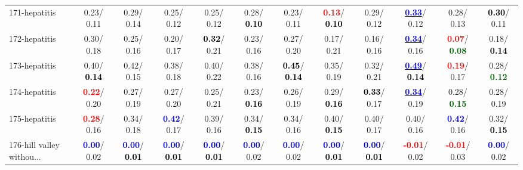 \begin{table}[h]
\begin{center}
{\begin{tabular}{lc|c|c|c|c|c|c|c|c|c|c}
171-hepatitis &   0.23/  0.11 &   0.29/  0.14 &   0.25/  0.12 &   0.25/  0.12 &   0.28/\textcolor{black}{\textbf{  0.10}} &   0.23/  0.11 & \textcolor{red}{\textbf{  0.13}}/\textcolor{black}{\textbf{  0.10}} &   0.29/  0.12 & \underline{\textcolor{blue}{\textbf{  0.33}}}/  0.12 &   0.28/  0.13 & \textcolor{black}{\textbf{  0.30}}/  0.11 \\
172-hepatitis &   0.30/  0.18 &   0.25/  0.16 &   0.20/  0.17 & \textcolor{black}{\textbf{  0.32}}/  0.21 &   0.23/  0.16 &   0.27/  0.20 &   0.17/  0.21 &   0.16/  0.16 & \underline{\textcolor{blue}{\textbf{  0.34}}}/  0.16 & \textcolor{red}{\textbf{  0.07}}/\textcolor{darkgreen}{\textbf{  0.08}} &   0.18/\textcolor{black}{\textbf{  0.14}} \\
173-hepatitis &   0.40/\textcolor{black}{\textbf{  0.14}} &   0.42/  0.15 &   0.38/  0.18 &   0.40/  0.22 &   0.38/  0.16 & \textcolor{black}{\textbf{  0.45}}/\textcolor{black}{\textbf{  0.14}} &   0.35/  0.19 &   0.32/  0.21 & \underline{\textcolor{blue}{\textbf{  0.49}}}/\textcolor{black}{\textbf{  0.14}} & \textcolor{red}{\textbf{  0.19}}/  0.17 &   0.28/\textcolor{darkgreen}{\textbf{  0.12}} \\
174-hepatitis & \textcolor{red}{\textbf{  0.22}}/  0.20 &   0.27/  0.19 &   0.27/  0.20 &   0.25/  0.21 &   0.23/\textcolor{black}{\textbf{  0.16}} &   0.26/  0.19 &   0.29/\textcolor{black}{\textbf{  0.16}} & \textcolor{black}{\textbf{  0.33}}/  0.17 & \underline{\textcolor{blue}{\textbf{  0.34}}}/  0.19 &   0.28/\textcolor{darkgreen}{\textbf{  0.15}} &   0.28/  0.19 \\ \hline
175-hepatitis & \textcolor{red}{\textbf{  0.28}}/  0.16 &   0.34/  0.18 & \textcolor{blue}{\textbf{  0.42}}/  0.17 &   0.39/  0.16 &   0.34/\textcolor{black}{\textbf{  0.15}} &   0.34/  0.16 &   0.40/\textcolor{black}{\textbf{  0.15}} &   0.40/  0.17 &   0.40/  0.16 & \textcolor{blue}{\textbf{  0.42}}/  0.16 &   0.32/\textcolor{black}{\textbf{  0.15}} \\
176-hill valley withou... & \textcolor{blue}{\textbf{  0.00}}/  0.02 & \textcolor{blue}{\textbf{  0.00}}/\textcolor{black}{\textbf{  0.01}} & \textcolor{blue}{\textbf{  0.00}}/\textcolor{black}{\textbf{  0.01}} & \textcolor{blue}{\textbf{  0.00}}/\textcolor{black}{\textbf{  0.01}} & \textcolor{blue}{\textbf{  0.00}}/  0.02 & \textcolor{blue}{\textbf{  0.00}}/  0.02 & \textcolor{blue}{\textbf{  0.00}}/\textcolor{black}{\textbf{  0.01}} & \textcolor{blue}{\textbf{  0.00}}/\textcolor{black}{\textbf{  0.01}} & \textcolor{red}{\textbf{ -0.01}}/  0.02 & \textcolor{red}{\textbf{ -0.01}}/  0.03 & \textcolor{blue}{\textbf{  0.00}}/  0.02 \\

\end{tabular}}
\end{center}
\end{table}
